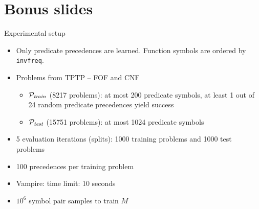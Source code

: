 \documentclass[notes]{beamer}
\begin{document}
\section{Bonus slides}

\begin{frame}\sectionpage\end{frame}

\begin{frame}{Experimental setup}
\begin{itemize}
	\item Only predicate precedences are learned.
	Function symbols are ordered by \texttt{invfreq}.
	\item Problems from TPTP \cite{Sut17} -- FOF and CNF
	\begin{itemize}
		\item $\mathcal{P}_{\mathit{train}}$ (8217 problems):
		at most 200 predicate symbols,
		at least 1 out of 24 random predicate precedences yield success
		\item $\mathcal{P}_{\mathit{test}}$ (15751 problems):
		at most 1024 predicate symbols
	\end{itemize}
	\item 5 evaluation iterations (splits): 1000 training problems and 1000 test problems
	\item 100 precedences per training problem
	\item Vampire: time limit: 10 seconds
	\item $10^6$ symbol pair samples to train $M$
\end{itemize}
\end{frame}
\end{document}
